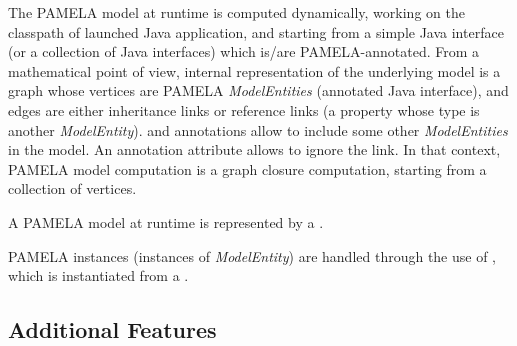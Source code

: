 The PAMELA model at runtime is computed dynamically, working on the classpath of
launched Java application, and starting from a simple Java interface (or a
collection of Java interfaces) which is/are PAMELA-annotated. From a
mathematical point of view, internal representation of the underlying model is
a graph whose vertices are PAMELA \emph{ModelEntities} (annotated Java
interface), and edges are either inheritance links or reference links (a
property whose type is another \emph{ModelEntity}).  and
   annotations allow to include some other
  \emph{ModelEntities} in the model. An annotation attribute
   allows to ignore the link. In that
  context, PAMELA model computation is a graph closure computation, starting
  from a collection of vertices.

A PAMELA model at runtime is represented by a .

PAMELA instances (instances of \emph{ModelEntity}) are handled through the use of , which is instantiated from a .


\subsection{Additional Features}

